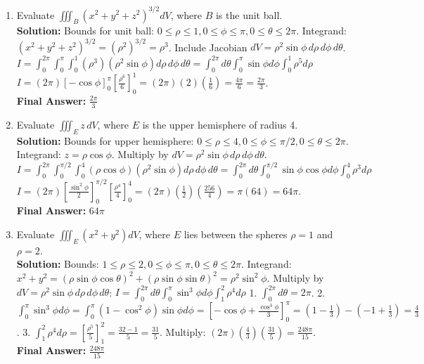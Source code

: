 \documentclass[11pt]{article}
\begin{document}
\begin{enumerate}[label=\textbf{\arabic*.}]
\item Evaluate $\iiint_B (x^2+y^2+z^2)^{3/2} dV$, where $B$ is the unit ball.\\
\textbf{Solution:} 
Bounds for unit ball: $0 \le \rho \le 1, 0 \le \phi \le \pi, 0 \le \theta \le 2\pi$.
Integrand: $(x^2+y^2+z^2)^{3/2} = (\rho^2)^{3/2} = \rho^3$.
Include Jacobian $dV = \rho^2\sin\phi \,d\rho \,d\phi \,d\theta$.
$I = \int_0^{2\pi} \int_0^\pi \int_0^1 (\rho^3)(\rho^2\sin\phi) d\rho \,d\phi \,d\theta = \int_0^{2\pi} d\theta \int_0^\pi \sin\phi d\phi \int_0^1 \rho^5 d\rho$
$I = (2\pi) [-\cos\phi]_0^\pi [\frac{\rho^6}{6}]_0^1 = (2\pi) (2) (\frac{1}{6}) = \frac{4\pi}{6} = \frac{2\pi}{3}$.\\
\textbf{Final Answer:} $\frac{2\pi}{3}$

\item Evaluate $\iiint_E z \, dV$, where $E$ is the upper hemisphere of radius 4.\\
\textbf{Solution:} 
Bounds for upper hemisphere: $0 \le \rho \le 4, 0 \le \phi \le \pi/2, 0 \le \theta \le 2\pi$.
Integrand: $z = \rho\cos\phi$. Multiply by $dV = \rho^2\sin\phi \,d\rho \,d\phi \,d\theta$.
$I = \int_0^{2\pi} \int_0^{\pi/2} \int_0^4 (\rho\cos\phi)(\rho^2\sin\phi) d\rho \,d\phi \,d\theta = \int_0^{2\pi} d\theta \int_0^{\pi/2} \sin\phi\cos\phi d\phi \int_0^4 \rho^3 d\rho$
$I = (2\pi) [\frac{\sin^2\phi}{2}]_0^{\pi/2} [\frac{\rho^4}{4}]_0^4 = (2\pi) (\frac{1}{2}) (\frac{256}{4}) = \pi(64) = 64\pi$.\\
\textbf{Final Answer:} $64\pi$

\item Evaluate $\iiint_E (x^2+y^2) dV$, where $E$ lies between the spheres $\rho=1$ and $\rho=2$.\\
\textbf{Solution:}
Bounds: $1 \le \rho \le 2, 0 \le \phi \le \pi, 0 \le \theta \le 2\pi$.
Integrand: $x^2+y^2 = (\rho\sin\phi\cos\theta)^2 + (\rho\sin\phi\sin\theta)^2 = \rho^2\sin^2\phi$.
Multiply by $dV = \rho^2\sin\phi \,d\rho \,d\phi \,d\theta$:
$I = \int_0^{2\pi} d\theta \int_0^\pi \sin^3\phi d\phi \int_1^2 \rho^4 d\rho$
1. $\int_0^{2\pi} d\theta = 2\pi$.
2. $\int_0^\pi \sin^3\phi d\phi = \int_0^\pi (1-\cos^2\phi)\sin\phi d\phi = [-\cos\phi + \frac{\cos^3\phi}{3}]_0^\pi = (1 - \frac{1}{3}) - (-1 + \frac{1}{3}) = \frac{4}{3}$.
3. $\int_1^2 \rho^4 d\rho = [\frac{\rho^5}{5}]_1^2 = \frac{32-1}{5} = \frac{31}{5}$.
Multiply: $(2\pi)(\frac{4}{3})(\frac{31}{5}) = \frac{248\pi}{15}$.\\
\textbf{Final Answer:} $\frac{248\pi}{15}$


\end{enumerate}
\end{document}
